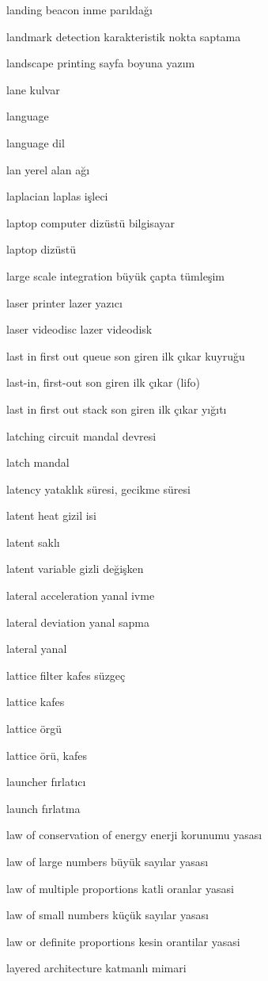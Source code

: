\documentclass[12pt,fleqn]{article}\usepackage{../../common}
\begin{document}
landing beacon inme parıldağı

landmark detection karakteristik nokta saptama

landscape printing sayfa boyuna yazım

lane kulvar

language

language dil

lan yerel alan ağı

laplacian laplas işleci

laptop computer dizüstü bilgisayar

laptop dizüstü

large scale integration büyük çapta tümleşim

laser printer lazer yazıcı

laser videodisc lazer videodisk

last in first out queue son giren ilk çıkar kuyruğu

last-in, first-out son giren ilk çıkar (lifo)

last in first out stack son giren ilk çıkar yığıtı

latching circuit mandal devresi

latch mandal

latency yataklık süresi, gecikme süresi

latent heat gizil isi

latent saklı

latent variable gizli değişken

lateral acceleration yanal ivme

lateral deviation yanal sapma

lateral yanal

lattice filter kafes süzgeç

lattice kafes

lattice örgü

lattice örü, kafes

launcher fırlatıcı

launch fırlatma

law of conservation of energy enerji korunumu yasası

law of large numbers büyük sayılar yasası

law of multiple proportions katli oranlar yasasi

law of small numbers küçük sayılar yasası

law or definite proportions kesin orantilar yasasi

layered architecture katmanlı mimari
\end{document}
